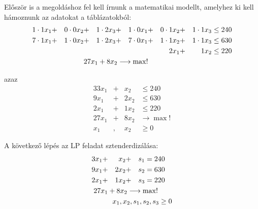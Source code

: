 \documentclass[a4paper,12pt,svgnames]{report}
\begin{document}
Először is a megoldáshoz fel kell írnunk a matematikai modellt, amelyhez ki kell hámoznunk az adatokat a táblázatokból:
\begin{alignat*}{6}
1\cdot 1x_1&+&0\cdot0x_2&+&1\cdot2x_3&+&1\cdot0x_1&+&0\cdot1x_2&+&1\cdot1x_3&\leq240\\
7\cdot1x_1&+&1\cdot0x_2&+&1\cdot2x_3&+&7\cdot0x_1&+&1\cdot1x_2&+&1\cdot1x_3&\leq630\\
&&&&&&&&2x_1&+&1x_2&\leq220\\
&&&\mathrlap{27x_1+8x_2\longrightarrow\max!}
\end{alignat*}

azaz
\begin{alignat*}{3}
3x_1&+&x_2&\leq240\\
9x_1&+&2x_2&\leq630\\
2x_1&+&1x_2&\leq220\\
27x_1&+&8x_2&\longrightarrow\max!\\
x_1&,&x_2&\geq0
\end{alignat*}

A következő lépés az LP feladat sztenderdizálása:
\begin{alignat*}{5}
3x_1&+&x_2&+&s_1&=240\\
9x_1&+&2x_2&+&s_2&=630\\
2x_1&+&1x_2&+&s_3&=220\\
&&\mathclap{27x_1+8x_2\longrightarrow\max!}\\
&&&&&&\mathllap{x_1,x_2,s_1,s_2,s_3\geq0}
\end{alignat*}
\end{document}
